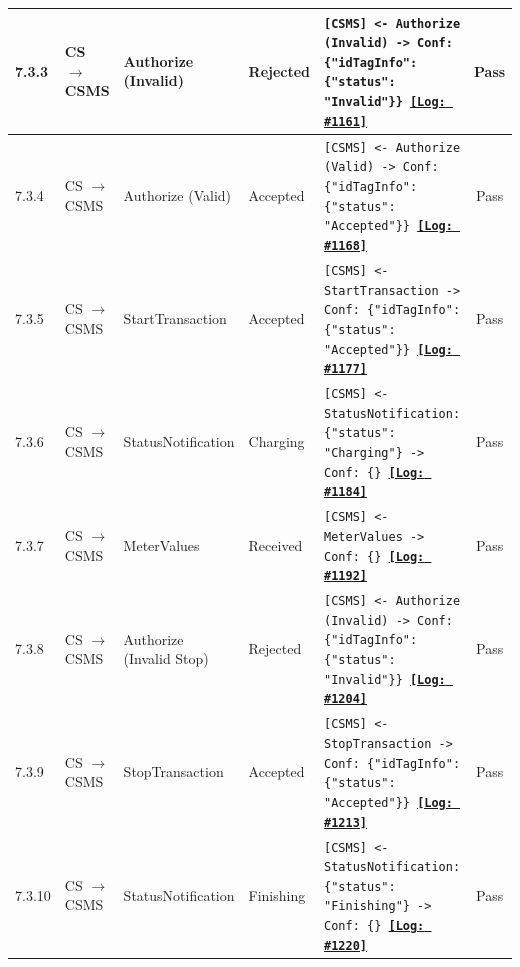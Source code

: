 \documentclass[10pt, a4paper, landscape]{article}
\begin{document}
\begin{longtable}{|p{1.0cm}|p{2.5cm}|p{4.0cm}|p{5.0cm}|p{10.0cm}|c|}
\hline
7.3.3 & CS $\to$ CSMS & Authorize (Invalid) & Rejected & \footnotesize\texttt{[CSMS] <- Authorize (Invalid) \newline [CSMS] -> Conf: \{"idTagInfo": \{"status": "Invalid"\}\} \newline \hyperref[log:7.3.3]{\textbf{[Log: \#1161]}}} & Pass \\
\hline
7.3.4 & CS $\to$ CSMS & Authorize (Valid) & Accepted & \footnotesize\texttt{[CSMS] <- Authorize (Valid) \newline [CSMS] -> Conf: \{"idTagInfo": \{"status": "Accepted"\}\} \newline \hyperref[log:7.3.4]{\textbf{[Log: \#1168]}}} & Pass \\
\hline
7.3.5 & CS $\to$ CSMS & StartTransaction & Accepted & \footnotesize\texttt{[CSMS] <- StartTransaction \newline [CSMS] -> Conf: \{"idTagInfo": \{"status": "Accepted"\}\} \newline \hyperref[log:7.3.5]{\textbf{[Log: \#1177]}}} & Pass \\
\hline
7.3.6 & CS $\to$ CSMS & StatusNotification & Charging & \footnotesize\texttt{[CSMS] <- StatusNotification: \{"status": "Charging"\} \newline [CSMS] -> Conf: \{\} \newline \hyperref[log:7.3.6]{\textbf{[Log: \#1184]}}} & Pass \\
\hline
7.3.7 & CS $\to$ CSMS & MeterValues & Received & \footnotesize\texttt{[CSMS] <- MeterValues \newline [CSMS] -> Conf: \{\} \newline \hyperref[log:7.3.7]{\textbf{[Log: \#1192]}}} & Pass \\
\hline
7.3.8 & CS $\to$ CSMS & Authorize (Invalid Stop) & Rejected & \footnotesize\texttt{[CSMS] <- Authorize (Invalid) \newline [CSMS] -> Conf: \{"idTagInfo": \{"status": "Invalid"\}\} \newline \hyperref[log:7.3.8]{\textbf{[Log: \#1204]}}} & Pass \\
\hline
7.3.9 & CS $\to$ CSMS & StopTransaction & Accepted & \footnotesize\texttt{[CSMS] <- StopTransaction \newline [CSMS] -> Conf: \{"idTagInfo": \{"status": "Accepted"\}\} \newline \hyperref[log:7.3.9]{\textbf{[Log: \#1213]}}} & Pass \\
\hline
7.3.10 & CS $\to$ CSMS & StatusNotification & Finishing & \footnotesize\texttt{[CSMS] <- StatusNotification: \{"status": "Finishing"\} \newline [CSMS] -> Conf: \{\} \newline \hyperref[log:7.3.10]{\textbf{[Log: \#1220]}}} & Pass \\

\end{longtable}
\end{document}
